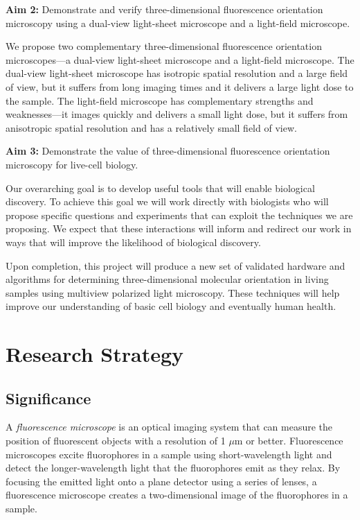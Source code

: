 \documentclass[11pt]{article}
\begin{document}
\noindent\textbf{Aim 2:} Demonstrate and verify three-dimensional fluorescence
orientation microscopy using a dual-view light-sheet microscope and a
light-field microscope.

We propose two complementary three-dimensional fluorescence orientation
microscopes---a dual-view light-sheet microscope and a light-field
microscope. The dual-view light-sheet microscope has isotropic spatial
resolution and a large field of view, but it suffers from long imaging times and
it delivers a large light dose to the sample. The light-field microscope has
complementary strengths and weaknesses---it images quickly and delivers a small
light dose, but it suffers from anisotropic spatial resolution and has a
relatively small field of view.

\noindent\textbf{Aim 3:} Demonstrate the value of three-dimensional fluorescence
orientation microscopy for live-cell biology.

Our overarching goal is to develop useful tools that will enable biological
discovery. To achieve this goal we will work directly with biologists who will
propose specific questions and experiments that can exploit the techniques we
are proposing. We expect that these interactions will inform and redirect our
work in ways that will improve the likelihood of biological discovery.

Upon completion, this project will produce a new set of validated hardware and
algorithms for determining three-dimensional molecular orientation in living
samples using multiview polarized light microscopy. These techniques will help
improve our understanding of basic cell biology and eventually human health.

\pagebreak

\section*{Research Strategy}
\subsection*{Significance}
A \textit{fluorescence microscope} is an optical imaging system that can measure
the position of fluorescent objects with a resolution of 1 $\mu$m or better.
Fluorescence microscopes excite fluorophores in a sample using short-wavelength
light and detect the longer-wavelength light that the fluorophores emit as they
relax. By focusing the emitted light onto a plane detector using a series of
lenses, a fluorescence microscope creates a two-dimensional image of the
fluorophores in a sample.
\end{document}
